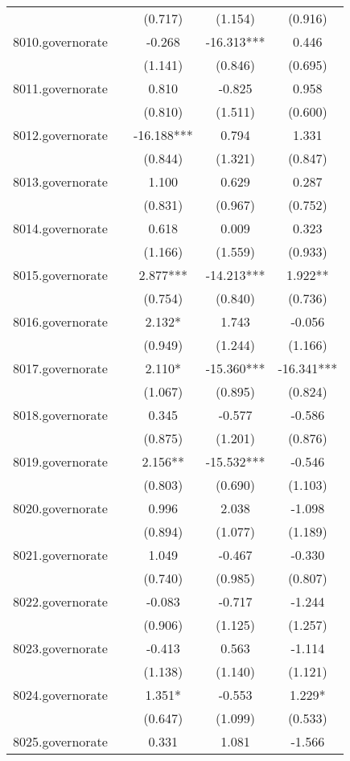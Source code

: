 \documentclass[]{article}
\begin{document}
\begin{tabular}{lcccc}
 &  & (0.717) & (1.154) & (0.916) \\
8010.governorate &  & -0.268 & -16.313*** & 0.446 \\
 &  & (1.141) & (0.846) & (0.695) \\
8011.governorate &  & 0.810 & -0.825 & 0.958 \\
 &  & (0.810) & (1.511) & (0.600) \\
8012.governorate &  & -16.188*** & 0.794 & 1.331 \\
 &  & (0.844) & (1.321) & (0.847) \\
8013.governorate &  & 1.100 & 0.629 & 0.287 \\
 &  & (0.831) & (0.967) & (0.752) \\
8014.governorate &  & 0.618 & 0.009 & 0.323 \\
 &  & (1.166) & (1.559) & (0.933) \\
8015.governorate &  & 2.877*** & -14.213*** & 1.922** \\
 &  & (0.754) & (0.840) & (0.736) \\
8016.governorate &  & 2.132* & 1.743 & -0.056 \\
 &  & (0.949) & (1.244) & (1.166) \\
8017.governorate &  & 2.110* & -15.360*** & -16.341*** \\
 &  & (1.067) & (0.895) & (0.824) \\
8018.governorate &  & 0.345 & -0.577 & -0.586 \\
 &  & (0.875) & (1.201) & (0.876) \\
8019.governorate &  & 2.156** & -15.532*** & -0.546 \\
 &  & (0.803) & (0.690) & (1.103) \\
8020.governorate &  & 0.996 & 2.038 & -1.098 \\
 &  & (0.894) & (1.077) & (1.189) \\
8021.governorate &  & 1.049 & -0.467 & -0.330 \\
 &  & (0.740) & (0.985) & (0.807) \\
8022.governorate &  & -0.083 & -0.717 & -1.244 \\
 &  & (0.906) & (1.125) & (1.257) \\
8023.governorate &  & -0.413 & 0.563 & -1.114 \\
 &  & (1.138) & (1.140) & (1.121) \\
8024.governorate &  & 1.351* & -0.553 & 1.229* \\
 &  & (0.647) & (1.099) & (0.533) \\
8025.governorate &  & 0.331 & 1.081 & -1.566 \\

\end{tabular}
\end{document}
